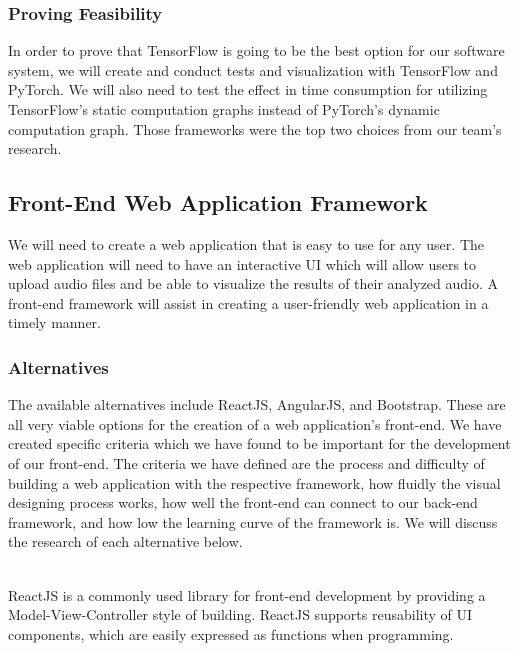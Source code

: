 \documentclass[12pt,journal,compsoc]{IEEEtran}
\newenvironment{subs}
  {\adjustwidth{1em}{0pt}}
  {\endadjustwidth}
\begin{document}
\begin{subs}
\begin{subs}
\subsubsection{Proving Feasibility}
In order to prove that TensorFlow is going to be the best option for our software system, we will create and conduct tests and visualization with TensorFlow and PyTorch. We will also need to test the effect in time consumption for utilizing TensorFlow’s static computation graphs instead of PyTorch’s dynamic computation graph. Those frameworks were the top two choices from our team’s research. 
\end{subs}

\subsection{Front-End Web Application Framework}
We will need to create a web application that is easy to use for any user. The web application will need to have an interactive UI which will allow users to upload audio files and be able to visualize the results of their analyzed audio. A front-end framework will assist in creating a user-friendly web application in a timely manner.

\begin{subs}
\subsubsection{Alternatives}
The available alternatives include ReactJS, AngularJS, and Bootstrap. These are all very viable options for the creation of a web application’s front-end. We have created specific criteria which we have found to be important for the development of our front-end. The criteria we have defined are the process and difficulty of building a web application with the respective framework, how fluidly the visual designing process works, how well the front-end can connect to our back-end framework, and how low the learning curve of the framework is. We will discuss the research of each alternative below.

\begin{subs}
\\
ReactJS is a commonly used library for front-end development by providing a Model-View-Controller style of building. ReactJS supports reusability of UI components, which are easily expressed as functions when programming. 


\end{subs}
\end{subs}
\end{subs}
\end{document}
